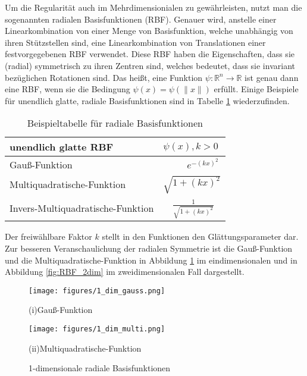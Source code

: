 \documentclass[12pt,titlepage]{article}
\begin{document}
Um die Regularität auch im Mehrdimensionialen zu gewährleisten, nutzt man die sogenannten radialen Basisfunktionen (RBF). Genauer wird, anstelle einer Linearkombination von einer Menge von Basisfunktion, welche unabhängig von ihren Stützstellen sind, eine Linearkombination von Translationen einer festvorgegebenen RBF verwendet. Diese RBF haben die Eigenschaften, dass sie (radial) symmetrisch zu ihren Zentren sind, welches bedeutet, dass sie invariant bezüglichen Rotationen sind. Das heißt, eine Funktion $\psi:\mathbb{R}^n\rightarrow\mathbb{R}$ ist genau dann eine RBF, wenn sie die Bedingung $\psi(x)=\psi(\|x\|)$ erfüllt. Einige Beispiele für unendlich glatte, radiale Basisfunktionen sind in Tabelle \ref{tbl:funktionstabelle} wiederzufinden.
\begin{table}[H]
\centering
\begin{tabular}{|l|l|}
\hline
\textbf{unendlich glatte RBF}  & \textbf{$\psi(x), k>0$} \\
\hline
\rule{0pt}{15pt}Gauß-Funktion&~~~~~$e^{-(kx)^2}$\\
\rule{0pt}{15pt}Multiquadratische-Funktion& $\sqrt{1+(kx)^2}$\\
\rule{0pt}{15pt}Invers-Multiquadratische-Funktion&~~$\frac{1}{\sqrt{1+(kx)^2}}$\\
\hline
\end{tabular}
\caption{Beispieltabelle für radiale Basisfunktionen}
\label{tbl:funktionstabelle}
\end{table}
\noindent
Der freiwählbare Faktor $k$ stellt in den Funktionen den Glättungsparameter dar. Zur besseren Veranschaulichung der radialen Symmetrie ist die Gauß-Funktion und die Multiquadratische-Funktion in Abbildung \ref{fig:RBF_1dim} im eindimensionalen und in Abbildung \ref{fig:RBF_2dim} im zweidimensionalen Fall dargestellt.
\begin{figure}[H]
	\centering
\hspace{-1.4cm}
\begin{minipage}{0.45\textwidth}
	\texttt{[image: figures/1\_dim\_gauss.png]}
	\caption*{(i)Gauß-Funktion}
\end{minipage}
\hspace{0.5cm}
\begin{minipage}{0.45\textwidth}
	\texttt{[image: figures/1\_dim\_multi.png]}
	\caption*{(ii)Multiquadratische-Funktion}
\end{minipage}
	\caption{1-dimensionale radiale Basisfunktionen}
	\label{fig:RBF_1dim}
\end{figure}
\end{document}
